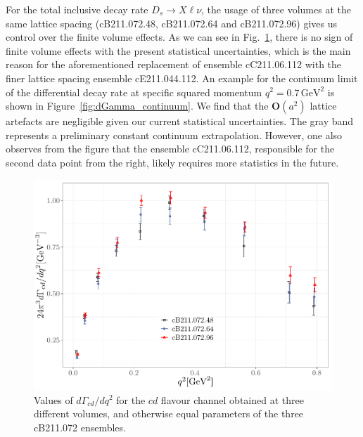 \documentclass [a4paper, 11pt]{article}
\begin{document}
For the total inclusive decay rate $D_s \to X\ell\nu$, the usage of three volumes
at the same lattice spacing (cB211.072.48, cB211.072.64 and cB211.072.96)
gives us control over the finite volume effects. As we can see in Fig.~\ref{fig:dGamma_FSE_B},
there is no sign of finite volume effects with the present statistical
uncertainties, which is the main reason for the aforementioned
replacement of ensemble cC211.06.112 with the finer lattice spacing
ensemble cE211.044.112.
An example for the continuum limit of the differential decay rate at
specific squared momentum $q^2=0.7\,\mathrm{GeV}^2$ is shown in
Figure~\ref{fig:dGamma_continuum}. We find that the 
$\mathbf{O}(a^2)$ lattice artefacts are negligible given our current
statistical uncertainties. The gray band represents a preliminary
constant continuum extrapolation. However, one also observes from the
figure that the ensemble cC211.06.112, responsible for the second data point
from the right, likely requires more statistics in the future.

\begin{figure}
  \begin{center}
    \includegraphics[scale=0.7]{figures/dGamma_FSE_B.pdf}
    \caption{Values of $d\Gamma_{cd}/dq^2$ for the $cd$ flavour
      channel obtained at three different volumes, and otherwise equal
      parameters of the three cB211.072 ensembles.}
    \label{fig:dGamma_FSE_B}
  \end{center}
\end{figure}
\end{document}
